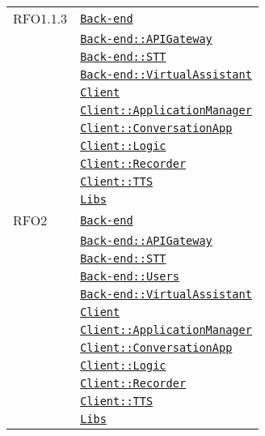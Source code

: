 \begin{longtable}{|>{\centering}m{3cm}|m{10cm}<{\centering}|}
RFO1.1.3 & \hyperref[Back-end]{\texttt{Back-end}}\\
& \hyperref[Back-end::APIGateway]{\texttt{Back-end::APIGateway}}\\
& \hyperref[Back-end::STT]{\texttt{Back-end::STT}}\\
& \hyperref[Back-end::VirtualAssistant]{\texttt{Back-end::VirtualAssistant}}\\
& \hyperref[Client]{\texttt{Client}}\\
& \hyperref[Client::ApplicationManager]{\texttt{Client::ApplicationManager}}\\
& \hyperref[Client::ConversationApp]{\texttt{Client::ConversationApp}}\\
& \hyperref[Client::Logic]{\texttt{Client::Logic}}\\
& \hyperref[Client::Recorder]{\texttt{Client::Recorder}}\\
& \hyperref[Client::TTS]{\texttt{Client::TTS}}\\
& \hyperref[Libs]{\texttt{Libs}}\\ \hline

RFO2 & \hyperref[Back-end]{\texttt{Back-end}}\\
& \hyperref[Back-end::APIGateway]{\texttt{Back-end::APIGateway}}\\
& \hyperref[Back-end::STT]{\texttt{Back-end::STT}}\\
& \hyperref[Back-end::Users]{\texttt{Back-end::Users}}\\
& \hyperref[Back-end::VirtualAssistant]{\texttt{Back-end::VirtualAssistant}}\\
& \hyperref[Client]{\texttt{Client}}\\
& \hyperref[Client::ApplicationManager]{\texttt{Client::ApplicationManager}}\\
& \hyperref[Client::ConversationApp]{\texttt{Client::ConversationApp}}\\
& \hyperref[Client::Logic]{\texttt{Client::Logic}}\\
& \hyperref[Client::Recorder]{\texttt{Client::Recorder}}\\
& \hyperref[Client::TTS]{\texttt{Client::TTS}}\\
& \hyperref[Libs]{\texttt{Libs}}\\ \hline


\end{longtable}

